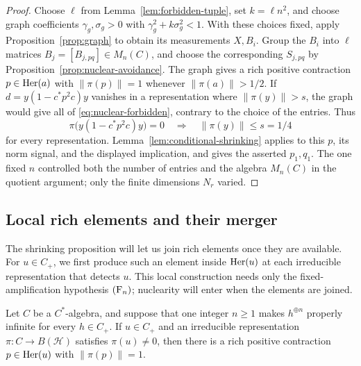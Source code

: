 \begin{proof}
Choose \(\ell\) from Lemma~\ref{lem:forbidden-tuple}, set
\(k=\ell n^2\), and choose graph coefficients
\(\gamma_g,\sigma_g>0\) with \(\gamma_g^2+k\sigma_g^2<1\).
With these choices fixed, apply Proposition~\ref{prop:graph} to obtain
its measurements \(X,B_i\).  Group the \(B_i\) into \(\ell\) matrices
\(B_j=[B_{j,pq}]\in M_n(C)\), and choose the corresponding
\(S_{j,pq}\) by Proposition~\ref{prop:nuclear-avoidance}.
The graph gives a rich positive contraction \(p\in\operatorname{Her}(a)\) with
\(\|\pi(p)\|=1\) whenever \(\|\pi(a)\|>1/2\).  If
\(d=y(1-c^*p^2c)y\) vanishes in a representation where
\(\|\pi(y)\|>s\), the graph would give all of
\eqref{eq:nuclear-forbidden}, contrary to the choice of the entries.
Thus
\begin{equation}\label{eq:nonvanishing-N}
 \pi\bigl(y(1-c^*p^2c)y\bigr)=0
 \quad\Longrightarrow\quad\|\pi(y)\|\le s=1/4
\end{equation}
for every representation.  Lemma~\ref{lem:conditional-shrinking}
applies to this \(p\), its norm signal, and the displayed implication,
and gives the asserted \(p_1,q_1\).  The one fixed \(n\) controlled
both the number of entries and the algebra \(M_n(C)\) in the quotient
argument; only the finite dimensions \(N_r\) varied.
\end{proof}

\subsection{Local rich elements and their merger}

The shrinking proposition will let us join rich elements once they
are available.  For \(u\in C_+\), we first produce such an element inside \(\operatorname{Her}(u)\) at
each irreducible representation that detects \(u\).  This local
construction needs only the fixed-amplification hypothesis
\(\textup{(F\ensuremath{_n})}\); nuclearity will enter when the elements are joined.

\begin{lemma}
\label{lem:local-rich}
Let \(C\) be a \(C^*\)-algebra, and suppose that one integer
\(n\ge1\) makes \(h^{\oplus n}\) properly infinite for every
\(h\in C_+\).  If \(u\in C_+\) and an irreducible representation
\(\pi:C\to B(\mathcal H)\) satisfies \(\pi(u)\ne0\), then there is
a rich positive contraction \(p\in\operatorname{Her}(u)\) with \(\|\pi(p)\|=1\).
\end{lemma}

